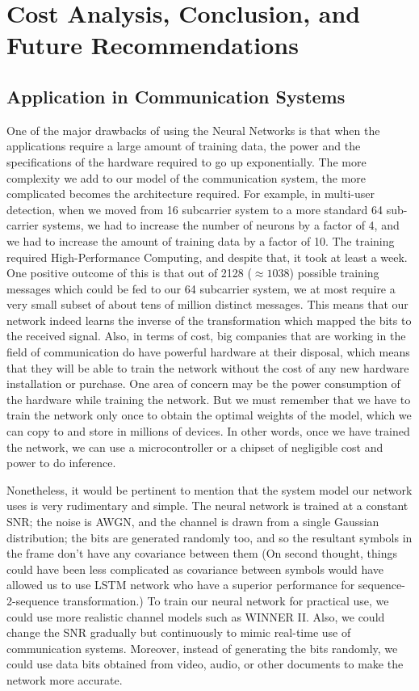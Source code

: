 
\chapter{Cost Analysis, Conclusion, and Future Recommendations} %
\label{Chapter5}
\lhead{} %

\section{Application in Communication Systems}
One of the major drawbacks of using the Neural Networks is that when the applications require a large amount of training data, the power and the specifications of the hardware required to go up exponentially. The more complexity we add to our model of the communication system, the more complicated becomes the architecture required. For example, in multi-user detection, when we moved from 16 subcarrier system to a more standard 64 sub-carrier systems, we had to increase the number of neurons by a factor of 4, and we had to increase the amount of training data by a factor of 10. The training required High-Performance Computing, and despite that, it took at least a week.  One positive outcome of this is that out of 2128 ($\approx 1038$) possible training messages which could be fed to our 64 subcarrier system, we at most require a very small subset of about tens of million distinct messages. This means that our network indeed learns the inverse of the transformation which mapped the bits to the received signal. Also, in terms of cost, big companies that are working in the field of communication do have powerful hardware at their disposal, which means that they will be able to train the network without the cost of any new hardware installation or purchase. One area of concern may be the power consumption of the hardware while training the network. But we must remember that we have to train the network only once to obtain the optimal weights of the model, which we can copy to and store in millions of devices. In other words, once we have trained the network, we can use a microcontroller or a chipset of negligible cost and power to do inference.


Nonetheless, it would be pertinent to mention that the system model our network uses is very rudimentary and simple. The neural network is trained at a constant SNR; the noise is AWGN, and the channel is drawn from a single Gaussian distribution; the bits are generated randomly too, and so the resultant symbols in the frame don’t have any covariance between them (On second thought, things could have been less complicated as covariance between symbols would have allowed us to use LSTM network who have a superior performance for sequence-2-sequence transformation.) To train our neural network for practical use, we could use more realistic channel models such as WINNER II. Also, we could change the SNR gradually but continuously to mimic real-time use of communication systems. Moreover, instead of generating the bits randomly, we could use data bits obtained from video, audio, or other documents to make the network more accurate. 

